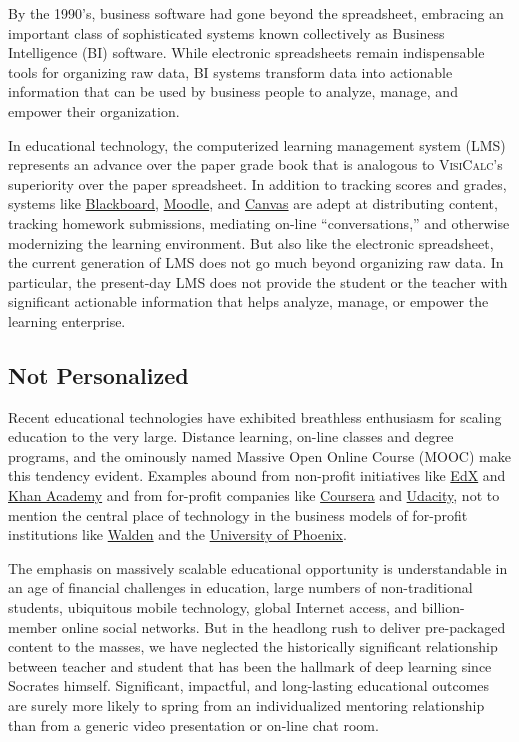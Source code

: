\documentclass{article}
\newcommand{\vcalc}{\textsc{VisiCalc}}
\begin{document}
By the 1990's, business software had gone beyond the spreadsheet,
embracing an important class of sophisticated systems
known collectively as Business Intelligence (BI) software.
While electronic spreadsheets
remain indispensable tools for organizing raw data,
BI systems transform data into actionable information
that can be used by business people
to analyze, manage, and empower their organization.

In educational technology,
the computerized learning management system (LMS)
represents an advance over the paper grade book
that is analogous to \vcalc{}'s superiority over the paper spreadsheet.
In addition to tracking scores and grades,
systems like
\href{https://www.blackboard.com/}{Blackboard},
\href{https://moodle.org/}{Moodle},
and
\href{https://www.instructure.com/canvas/}{Canvas}
are adept at distributing content,
tracking homework submissions,
mediating on-line ``conversations,''
and otherwise modernizing the learning environment.
But also like the electronic spreadsheet,
the current generation of LMS
does not go much beyond organizing raw data.
In particular,
the present-day LMS
does not provide the student or the teacher
with significant actionable information
that helps analyze, manage, or empower the learning enterprise.

\subsection{Not Personalized}
\label{sec:not-personalized}

Recent educational technologies
have exhibited breathless enthusiasm
for scaling education to the very large.
Distance learning, on-line classes and degree programs,
and the ominously named Massive Open Online Course (MOOC)
make this tendency evident.
Examples abound from non-profit initiatives like
\href{https://www.edx.org/}{EdX} and
\href{https://www.khanacademy.org/}{Khan Academy}
and from for-profit companies like
\href{https://www.coursera.org/}{Coursera}
and
\href{https://www.udacity.com/}{Udacity},
not to mention the central place of technology
in the business models of for-profit institutions
like
\href{https://waldenu.edu/}{Walden} and the
\href{https://www.phoenix.edu/}{University of Phoenix}.

The emphasis on massively scalable educational opportunity
is understandable in an age of financial challenges in education,
large numbers of non-tradi\-tional students,
ubiquitous mobile technology,
global Internet access,
and billion-member online social networks.
But in the headlong rush
to deliver pre-packaged content to the masses,
we have neglected the historically significant relationship
between teacher and student
that has been the hallmark of deep learning since Socrates himself.
Significant, impactful, and long-lasting educational outcomes
are surely more likely to spring
from an individualized mentoring relationship
than from a generic video presentation or on-line chat room.
\end{document}
